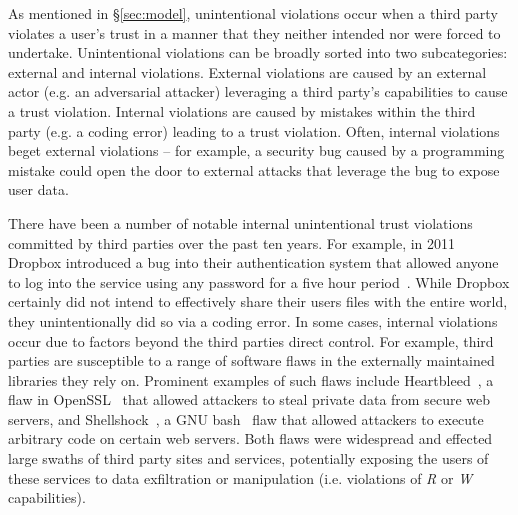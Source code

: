 As mentioned in \S\ref{sec:model}, unintentional violations occur
when a third party violates a user's trust in a manner that they
neither intended nor were forced to undertake. Unintentional
violations can be broadly sorted into two subcategories: external and
internal violations. External violations are caused by an external
actor (e.g. an adversarial attacker) leveraging a third party's
capabilities to cause a trust violation. Internal violations are
caused by mistakes within the third party (e.g. a coding error)
leading to a trust violation. Often, internal violations beget
external violations -- for example, a security bug caused by a
programming mistake could open the door to external attacks that
leverage the bug to expose user data.

There have been a number of notable internal unintentional trust
violations committed by third parties over the past ten years. For
example, in 2011 Dropbox introduced a bug into their authentication
system that allowed anyone to log into the service using any password
for a five hour period~\cite{dropbox-authbug}. While Dropbox certainly
did not intend to effectively share their users files with the entire
world, they unintentionally did so via a coding error. In some cases,
internal violations occur due to factors beyond the third parties
direct control. For example, third parties are susceptible to a range
of software flaws in the externally maintained libraries they rely
on. Prominent examples of such flaws include
Heartbleed~\cite{heartbleed}, a flaw in OpenSSL~\cite{openssl} that
allowed attackers to steal private data from secure web servers, and
Shellshock~\cite{symantec-shellshock}, a GNU bash~\cite{gnu-bash} flaw
that allowed attackers to execute arbitrary code on certain web
servers. Both flaws were widespread and effected large swaths of third
party sites and services, potentially exposing the users of these
services to data exfiltration or manipulation (i.e. violations of
\emph{R} or \emph{W} capabilities).

